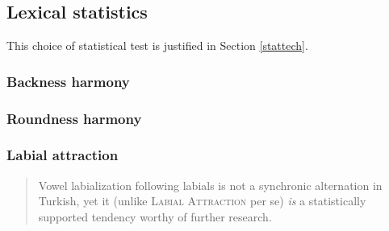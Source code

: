 \subsection{Lexical statistics}

This choice of statistical test is justified in Section \ref{stattech}.

\subsubsection{Backness harmony}

\subsubsection{Roundness harmony}



\subsubsection{Labial attraction}

\begin{quotation}
Vowel labialization following labials is not a synchronic alternation in Turkish, yet it (unlike \textsc{Labial Attraction} per se) \emph{is} a statistically supported tendency worthy of further research. \citep[][196, emphasis in original]{Inkelas2001} 
\end{quotation}


